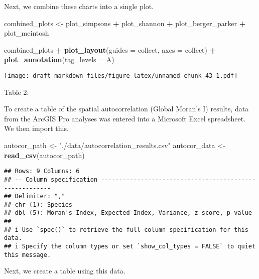 \documentclass[
]{article}
\newenvironment{Shaded}{\begin{snugshade}}{\end{snugshade}}
\newcommand{\AttributeTok}[1]{\textcolor[rgb]{0.13,0.29,0.53}{#1}}
\newcommand{\FunctionTok}[1]{\textcolor[rgb]{0.13,0.29,0.53}{\textbf{#1}}}
\newcommand{\NormalTok}[1]{#1}
\newcommand{\OtherTok}[1]{\textcolor[rgb]{0.56,0.35,0.01}{#1}}
\newcommand{\SpecialCharTok}[1]{\textcolor[rgb]{0.81,0.36,0.00}{\textbf{#1}}}
\newcommand{\StringTok}[1]{\textcolor[rgb]{0.31,0.60,0.02}{#1}}
\begin{document}
Next, we combine these charts into a single plot.

\begin{Shaded}
\begin{Highlighting}[]
\NormalTok{ combined\_plots }\OtherTok{\textless{}{-}}\NormalTok{ plot\_simpsons }\SpecialCharTok{+}\NormalTok{ plot\_shannon }\SpecialCharTok{+}\NormalTok{ plot\_berger\_parker }\SpecialCharTok{+}\NormalTok{ plot\_mcintosh}
 

\NormalTok{ combined\_plots }\SpecialCharTok{+} \FunctionTok{plot\_layout}\NormalTok{(}\AttributeTok{guides =} \StringTok{\textquotesingle{}collect\textquotesingle{}}\NormalTok{, }\AttributeTok{axes =} \StringTok{\textquotesingle{}collect\textquotesingle{}}\NormalTok{) }\SpecialCharTok{+} \FunctionTok{plot\_annotation}\NormalTok{(}\AttributeTok{tag\_levels =} \StringTok{\textquotesingle{}A\textquotesingle{}}\NormalTok{)}
\end{Highlighting}
\end{Shaded}

\texttt{[image: draft\_markdown\_files/figure-latex/unnamed-chunk-43-1.pdf]}

Table 2:

To create a table of the spatial autocorrelation (Global Moran's I)
results, data from the ArcGIS Pro analyses was entered into a Microsoft
Excel spreadsheet. We then import this.

\begin{Shaded}
\begin{Highlighting}[]
\NormalTok{autocor\_path }\OtherTok{\textless{}{-}} \StringTok{"./data/autocorrelation\_results.csv"}
\NormalTok{autocor\_data }\OtherTok{\textless{}{-}} \FunctionTok{read\_csv}\NormalTok{(autocor\_path)}
\end{Highlighting}
\end{Shaded}

\begin{verbatim}
## Rows: 9 Columns: 6
## -- Column specification --------------------------------------------------------
## Delimiter: ","
## chr (1): Species
## dbl (5): Moran's Index, Expected Index, Variance, z-score, p-value
## 
## i Use `spec()` to retrieve the full column specification for this data.
## i Specify the column types or set `show_col_types = FALSE` to quiet this message.
\end{verbatim}

Next, we create a table using this data.
\end{document}
